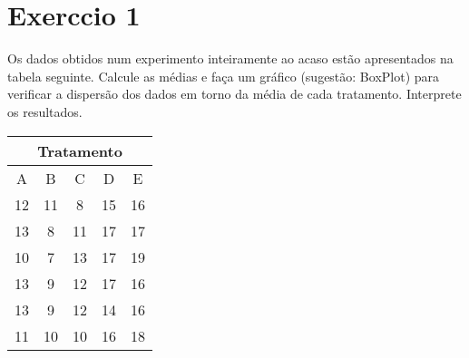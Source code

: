 \documentclass[a4paper,11pt,twoside,openright]{report}
\begin{document}
\begin{center}
\end{center}  



\section*{Exerccio 1}
\hspace{0.5cm}Os dados obtidos num experimento inteiramente ao acaso est\~{a}o apresentados na tabela seguinte. Calcule as m\'{e}dias e
fa\c{c}a um gr\'{a}fico (sugest\~{a}o: BoxPlot) para verificar a dispers\~{a}o dos dados em torno da m\'{e}dia de cada tratamento. 
Interprete os resultados.

\begin{center}
\begin{tabular}{l|l|l|l|l}
\hline
\multicolumn{5}{c}{Tratamento} \\ 
\hline
\multicolumn{1}{c|}{A} & \multicolumn{1}{c|}{B} & \multicolumn{1}{c|}{C} & \multicolumn{1}{c|}{D} & \multicolumn{1}{c}{E} \\ 
\hline
\multicolumn{1}{c|}{12} & \multicolumn{1}{c|}{11} & \multicolumn{1}{c|}{8} & \multicolumn{1}{c|}{15} & \multicolumn{1}{c}{16} \\ 
\multicolumn{1}{c|}{13} & \multicolumn{1}{c|}{8} & \multicolumn{1}{c|}{11} & \multicolumn{1}{c|}{17} & \multicolumn{1}{c}{17} \\ 
\multicolumn{1}{c|}{10} & \multicolumn{1}{c|}{7} & \multicolumn{1}{c|}{13} & \multicolumn{1}{c|}{17} & \multicolumn{1}{c}{19} \\ 
\multicolumn{1}{c|}{13} & \multicolumn{1}{c|}{9} & \multicolumn{1}{c|}{12} & \multicolumn{1}{c|}{17} & \multicolumn{1}{c}{16} \\ 
\multicolumn{1}{c|}{13} & \multicolumn{1}{c|}{9} & \multicolumn{1}{c|}{12} & \multicolumn{1}{c|}{14} & \multicolumn{1}{c}{16} \\ 
\multicolumn{1}{c|}{11} & \multicolumn{1}{c|}{10} & \multicolumn{1}{c|}{10} & \multicolumn{1}{c|}{16} & \multicolumn{1}{c}{18} \\ 
\hline
\end{tabular}
\end{center}
\end{document}
